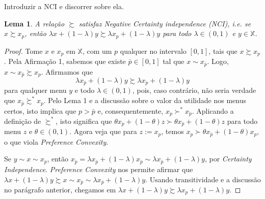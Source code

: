 \documentclass[11pt, a4paper]{article}
\theoremstyle{nonumberplain}
\newtheorem{proof}{Dem.}
\theoremstyle{plain}
\theoremstyle{plain}
\newtheorem{lemma}{Lema}
\begin{document}
{\color{blue} Introduzir a NCI e discorrer sobre ela.}

\begin{lemma}A relação $\succsim$ satisfaz \emph{Negative Certainty independence (NCI)}, i.e. se $x\succsim x_p$, então $\lambda x +(1-\lambda)y\succsim \lambda x_p +(1-\lambda)y$ para todo $\lambda\in(0,1)$ e $y\in \mathbb{X}$.\end{lemma}
\begin{proof}
Tome $x$ e $x_p$ em $\mathbb{X}$, com um $p$ qualquer no intervalo $[0,1]$, tais que $x\succsim x_p$. Pela Afirmação 1, sabemos que existe $\bar{p}\in [0,1]$ tal que $x\sim x_{\bar{p}}$. Logo, $x\sim x_{\bar{p}}\succsim x_p$. Afirmamos que $$\lambda x_{\bar{p}} +(1-\lambda)y\succsim \lambda x_p +(1-\lambda)y$$
para qualquer menu $y$ e todo $\lambda\in (0,1)$, pois, caso contrário, não seria verdade que $x_{\bar{p}}\succsim^*x_p$. Pelo Lema 1 e a discussão sobre o valor da utilidade nos menus certos, isto implica que $p>\bar{p}$ e, consequentemente, $x_p\succ^*x_{\bar{p}}$. Aplicando a definição de $\succsim^*$, isto significa que $\theta x_p + (1-\theta)z\succ \theta x_{\bar{p}}+(1-\theta)z$ para todo menu $z$ e $\theta\in (0,1)$. Agora veja que para $z:=x_p$, temos $x_p\succ \theta x_{\bar{p}} + (1-\theta)x_p$, o que viola \emph{Preference Convexity}.

Se $y\sim x\sim x_{\bar{p}}$, então $x_{\bar{p}}=\lambda x_{\bar{p}} + (1-\lambda)x_{\bar{p}}\sim\lambda x_{\bar{p}}+(1-\lambda)y$, por \emph{Certainty Independence}. \emph{Preference Convexity} nos permite afirmar que $\lambda x+(1-\lambda)y \succsim x \sim x_{\bar{p}} \sim \lambda x_{\bar{p}}+(1-\lambda)y$. Usando transitividade e a discussão no parágrafo anterior, chegamos em $\lambda x+(1-\lambda)y\succsim \lambda x_p + (1-\lambda)y$. 


\end{proof}
\end{document}
